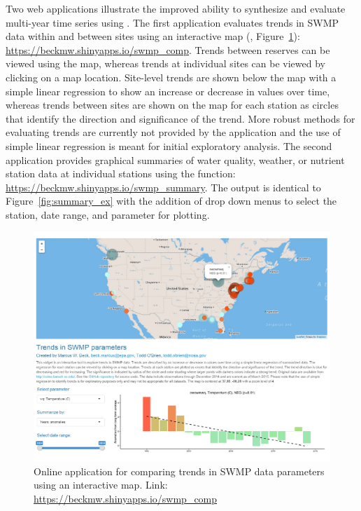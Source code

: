 Two  web applications illustrate the improved ability to synthesize and evaluate multi-year time series using .  The first application evaluates trends in SWMP data within and between sites using an interactive  map (\citet{Cheng15}, Figure~\ref{fig:swmp_comp}): \href{https://beckmw.shinyapps.io/swmp_comp}{https://beckmw.shinyapps.io/swmp\_comp}.  Trends between reserves can be viewed using the map, whereas trends at individual sites can be viewed by clicking on a map location.  Site-level trends are shown below the map with a simple linear regression to show an increase or decrease in values over time, whereas trends between sites are shown on the map for each station as circles that identify the direction and significance of the trend.  More robust methods for evaluating trends are currently not provided by the application and the use of simple linear regression is meant for initial exploratory analysis.  The second application provides graphical summaries of water quality, weather, or nutrient station data at individual stations using the  function: \href{https://beckmw.shinyapps.io/swmp_summary/}{https://beckmw.shinyapps.io/swmp\_summary}.  The output is identical to Figure~\ref{fig:summary_ex} with the addition of drop down menus to select the station, date range, and parameter for plotting.

\begin{figure}[!h]
\begin{center}
\includegraphics[width = \textwidth]{swmp_comp.pdf}
\caption{Online application for comparing trends in SWMP data parameters using an interactive map.  Link: \href{https://beckmw.shinyapps.io/swmp_comp}{https://beckmw.shinyapps.io/swmp\_comp}}
\label{fig:swmp_comp}
\end{center}
\end{figure}

